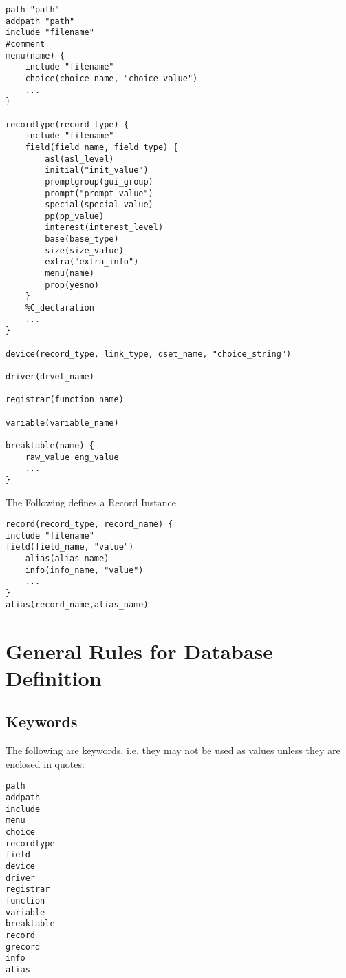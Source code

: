 \begin{verbatim}
path "path"
addpath "path"
include "filename"
#comment
menu(name) {
    include "filename"
    choice(choice_name, "choice_value")
    ...
}

recordtype(record_type) {
    include "filename"
    field(field_name, field_type) {
        asl(asl_level)
        initial("init_value")
        promptgroup(gui_group)
        prompt("prompt_value")
        special(special_value)
        pp(pp_value)
        interest(interest_level)
        base(base_type)
        size(size_value)
        extra("extra_info")
        menu(name)
        prop(yesno)
    }
    %C_declaration
    ...
}

device(record_type, link_type, dset_name, "choice_string")

driver(drvet_name)

registrar(function_name)

variable(variable_name)

breaktable(name) {
    raw_value eng_value
    ...
}
\end{verbatim}

The Following defines a Record Instance

\begin{verbatim}
record(record_type, record_name) {
include "filename"
field(field_name, "value")
    alias(alias_name)
    info(info_name, "value")
    ...
}
alias(record_name,alias_name)
\end{verbatim}

\section{General Rules for Database Definition}

\subsection{Keywords}

The following are keywords, i.e. they may not be used as values unless they are enclosed in quotes:

\begin{verbatim}
path
addpath
include
menu
choice
recordtype
field
device
driver
registrar
function
variable
breaktable
record
grecord
info
alias
\end{verbatim}

